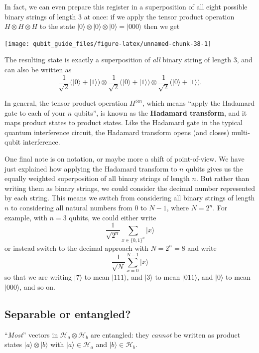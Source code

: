 \documentclass[fleqn,a4paper]{article}
\newenvironment{idea}{\everypar{\setlength{\parindent}{1.5em}}}{}
\theoremstyle{definition}
\theoremstyle{definition}
\theoremstyle{definition}
\theoremstyle{definition}
\theoremstyle{remark}
\begin{document}
In fact, we can even prepare this register in a superposition of all eight possible binary strings of length 3 at once: if we apply the tensor product operation \(H\otimes H\otimes H\) to the state \(|0\rangle\otimes|0\rangle\otimes|0\rangle = |000\rangle\) then we get

\begin{center}\texttt{[image: qubit\_guide\_files/figure-latex/unnamed-chunk-38-1]} \end{center}

The resulting state is exactly a superposition of \emph{all} binary string of length 3, and can also be written as
\[
  \frac{1}{\sqrt{2}} \big(|0\rangle + |1\rangle\big)
  \otimes
  \frac{1}{\sqrt{2}} \big(|0\rangle + |1\rangle\big)
  \otimes
  \frac{1}{\sqrt{2}} \big(|0\rangle + |1\rangle\big).
\]

In general, the tensor product operation \(H^{\otimes n}\), which means ``apply the Hadamard gate to each of your \(n\) qubits'', is known as the \textbf{Hadamard transform}, and it maps product states to product states.
Like the Hadamard gate in the typical quantum interference circuit, the Hadamard transform opens (and closes) multi-qubit interference.

One final note is on notation, or maybe more a shift of point-of-view.
We have just explained how applying the Hadamard transform to \(n\) qubits gives us the equally weighted superposition of all binary strings of length \(n\).
But rather than writing them as binary strings, we could consider the decimal number represented by each string.
This means we switch from considering all binary strings of length \(n\) to considering all natural numbers from \(0\) to \(N-1\), where \(N=2^n\).
For example, with \(n=3\) qubits, we could either write
\[
  \frac{1}{\sqrt{2^n}} \sum_{x\in\{0,1\}^n} |x\rangle
\]
or instead switch to the decimal approach with \(N=2^n=8\) and write
\[
  \frac{1}{\sqrt{N}} \sum_{x=0}^{N-1} |x\rangle
\]
so that we are writing \(|7\rangle\) to mean \(|111\rangle\), and \(|3\rangle\) to mean \(|011\rangle\), and \(|0\rangle\) to mean \(|000\rangle\), and so on.

\hypertarget{separable-or-entangled}{%
\subsection{Separable or entangled?}\label{separable-or-entangled}}

\begin{idea}
``\emph{Most}'' vectors in \(\mathcal{H}_a\otimes \mathcal{H}_b\) are entangled: they \emph{cannot} be written as product states \(|a\rangle\otimes|b\rangle\) with \(|a\rangle\in\mathcal{H}_a\) and \(|b\rangle\in\mathcal{H}_b\).

\end{idea}
\end{document}
